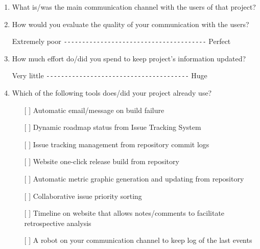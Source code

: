 \documentclass[lnbip]{svmultln}
\begin{document}
\begin{enumerate}
\item What is/was the main communication channel with the users of
  that project?
  \vspace{8pt}

\item How would you evaluate the quality of your communication with
  the users?

  Extremely poor \verb=---------------------------------------=
  Perfect \vspace{8pt}

\item How much effort do/did you spend to keep project's information
  updated?

  Very little \verb=---------------------------------------= Huge
  \vspace{8pt}

\item Which of the following tools does/did your project already use?
  \begin{itemize}
  \item[[ ] ] Automatic email/message on build failure
  \item[[ ] ] Dynamic roadmap status from Issue Tracking System
  \item[[ ] ] Issue tracking management from repository commit logs
  \item[[ ] ] Website one-click release build from repository
  \item[[ ] ] Automatic metric graphic generation and updating from
    repository
  \item[[ ] ] Collaborative issue priority sorting
  \item[[ ] ] Timeline on website that allows notes/comments to
    facilitate retrospective analysis
  \item[[ ] ] A robot on your communication channel to keep log of the
    last events
  \end{itemize}
  \vspace{8pt}


\end{enumerate}
\end{document}
